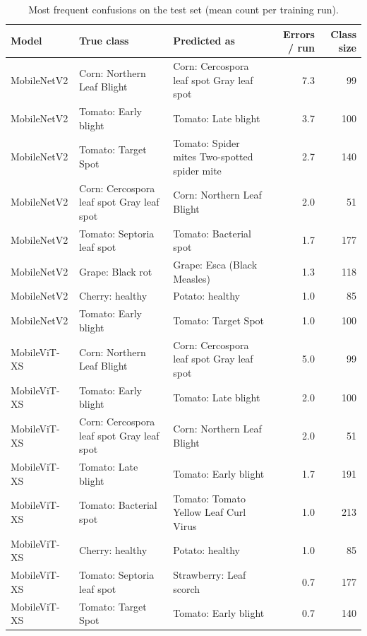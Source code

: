 \begin{table}[!t]
\centering
\scriptsize
\caption{Most frequent confusions on the test set (mean count per training run).}
\label{tab:confusions}
\begin{tabular}{lllrr}
\toprule
Model & True class & Predicted as & Errors / run & Class size \\
\midrule
MobileNetV2 & Corn: Northern Leaf Blight & Corn: Cercospora leaf spot Gray leaf spot & 7.3 & 99 \\
MobileNetV2 & Tomato: Early blight & Tomato: Late blight & 3.7 & 100 \\
MobileNetV2 & Tomato: Target Spot & Tomato: Spider mites Two-spotted spider mite & 2.7 & 140 \\
MobileNetV2 & Corn: Cercospora leaf spot Gray leaf spot & Corn: Northern Leaf Blight & 2.0 & 51 \\
MobileNetV2 & Tomato: Septoria leaf spot & Tomato: Bacterial spot & 1.7 & 177 \\
MobileNetV2 & Grape: Black rot & Grape: Esca (Black Measles) & 1.3 & 118 \\
MobileNetV2 & Cherry: healthy & Potato: healthy & 1.0 & 85 \\
MobileNetV2 & Tomato: Early blight & Tomato: Target Spot & 1.0 & 100 \\
MobileViT-XS & Corn: Northern Leaf Blight & Corn: Cercospora leaf spot Gray leaf spot & 5.0 & 99 \\
MobileViT-XS & Tomato: Early blight & Tomato: Late blight & 2.0 & 100 \\
MobileViT-XS & Corn: Cercospora leaf spot Gray leaf spot & Corn: Northern Leaf Blight & 2.0 & 51 \\
MobileViT-XS & Tomato: Late blight & Tomato: Early blight & 1.7 & 191 \\
MobileViT-XS & Tomato: Bacterial spot & Tomato: Tomato Yellow Leaf Curl Virus & 1.0 & 213 \\
MobileViT-XS & Cherry: healthy & Potato: healthy & 1.0 & 85 \\
MobileViT-XS & Tomato: Septoria leaf spot & Strawberry: Leaf scorch & 0.7 & 177 \\
MobileViT-XS & Tomato: Target Spot & Tomato: Early blight & 0.7 & 140 \\
\bottomrule
\end{tabular}
\end{table}
